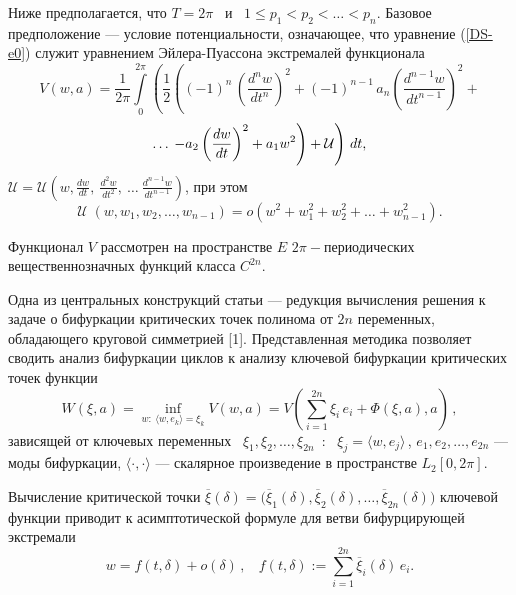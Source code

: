 
Ниже предполагается, что $T=2\pi$ \ и \ $1\leqslant p_1 < p_2<\dots <
p_n$. Базовое предположение --- условие потенциальности, означающее,
что уравнение (\ref{DS-e0}) служит уравнением Эйлера-Пуассона
экстремалей функционала
 $$
V(w,a)=\frac1{2\pi}\int\limits_0^{2\pi}\left( \frac12\left
((-1)^n\,\left(\frac{d^n w}{dt^n}\right)^2 + (-1)^{n-1}\,
a_n\left(\frac{d^{n-1} w}{dt^{n-1}}\right)^2 + \right.\right.
 $$
\begin{equation}\label{DS-e1}
	\dots\relax
		\left.
			\left.
				- a_2 \left(
					\frac{d w}{dt}
				\right)^2
				+ a_1
w^2\right) + \mathcal{U}\right)\,dt,
\end{equation}
$\mathcal{U}=\mathcal{U}\left(w,\frac{dw}{dt}, \ \frac{d^2w}{dt^2},
\ \dots \ \frac{d^{n-1} w}{dt^{n-1}}\right)$, при этом
$$
\mathcal{U}\;(w,w_1, w_2,\dots , w_{n-1}) = o(w^2+ w_1^2+ w_2^2+
\dots + w_{n-1}^2).
$$

Функционал $V$ рассмотрен на пространстве $E$
$2\pi-$пе\-ри\-о\-ди\-чес\-ких вещественнозначных  функций класса
$C^{2n}$.

Одна из центральных конструкций статьи --- редукция вычисления
решения к задаче о бифуркации критических точек полинома от $2n$
переменных, обладающего круговой симметрией [1]. Представленная методика позволяет сводить анализ
бифуркации циклов к анализу ключевой бифуркации критических точек
функции
\begin{equation}\label{DS-7.1}
W(\xi,a) = \inf_{w: \ \langle w,e_k \rangle =\xi_k} V(w,a) =
V\left(\sum\limits^{2n}_{i=1} \xi_i\,e_i + \Phi( \xi,a),a\right)\,,
\end{equation}
зависящей от ключевых переменных \ $\xi_1,\xi_2,\dots ,\xi_{2n}$\,
: \ $\xi_j = \langle
w,e_j\rangle$\,, $e_1,e_2,\dots ,e_{2n}$
--- моды бифуркации, $\langle \cdot,\cdot \rangle$ --- скалярное
произведение в пространстве $ L_2[0,2\pi]$.

Вычисление критической точки $\overline{\xi}(\delta) =
(\overline{\xi}_1(\delta),
\overline{\xi}_2(\delta),\dots,
$\linebreak $
\overline{\xi}_{2n}(\delta))$ ключевой функции приводит к
асимптотической формуле для ветви бифурцирующей экстремали
\begin{equation}\label{asimpt}
w = f(t,\delta) + o(\delta) \, , \ \ \ \  f(t,\delta):=
\sum\limits^{2n}_{i=1} \overline{\xi}_i(\delta)\,e_i.
\end{equation}

